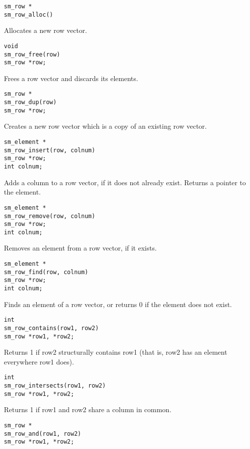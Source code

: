\begin{verbatim}
sm_row *
sm_row_alloc()
\end{verbatim}

        Allocates a new row vector.


\begin{verbatim}
void
sm_row_free(row)
sm_row *row;
\end{verbatim}

        Frees a row vector and discards its elements.


\begin{verbatim}
sm_row *
sm_row_dup(row)
sm_row *row;
\end{verbatim}

        Creates a new row vector which is a copy of an existing row vector.


\begin{verbatim}
sm_element *
sm_row_insert(row, colnum)
sm_row *row;
int colnum;
\end{verbatim}

        Adds a column to a row vector, if it does not already exist.  Returns
        a pointer to the element.


\begin{verbatim}
sm_element *
sm_row_remove(row, colnum)
sm_row *row;
int colnum;
\end{verbatim}

        Removes an element from a row vector, if it exists.


\begin{verbatim}
sm_element *
sm_row_find(row, colnum)
sm_row *row;
int colnum;
\end{verbatim}

        Finds an element of a row vector, or returns 0 if the element does not
        exist.


\begin{verbatim}
int
sm_row_contains(row1, row2)
sm_row *row1, *row2;
\end{verbatim}

        Returns 1 if row2 structurally contains row1 (that is, row2 has
        an element everywhere row1 does).


\begin{verbatim}
int
sm_row_intersects(row1, row2)
sm_row *row1, *row2;
\end{verbatim}

        Returns 1 if row1 and row2 share a column in common.


\begin{verbatim}
sm_row *
sm_row_and(row1, row2)
sm_row *row1, *row2;
\end{verbatim}

